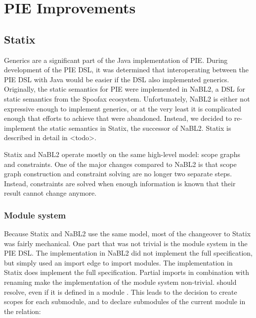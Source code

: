 \chapter{\label{chap:pie_improvements}PIE Improvements}


\section{\label{sec:solution__statix}Statix}
Generics are a significant part of the Java implementation of \ac{PIE}.
During development of the \ac{PIE} \ac{DSL}, it was determined that interoperating between the \ac{PIE} \ac{DSL} with Java would be easier if the \ac{DSL} also implemented generics.
Originally, the static semantics for \ac{PIE} were implemented in NaBL2, a \ac{DSL} for static semantics from the Spoofax ecosystem.
Unfortunately, \ac{NaBL2} is either not expressive enough to implement generics, or at the very least it is complicated enough that efforts to achieve that were abandoned. 
Instead, we decided to re-implement  the static semantics in Statix, the successor of \ac{NaBL2}.
Statix is described in detail in <todo>.

Statix and \ac{NaBL2} operate mostly on the same high-level model: scope graphs and constraints.
One of the major changes compared to \ac{NaBL2} is that scope graph construction and constraint solving are no longer two separate steps.
Instead, constraints are solved when enough information is known that their result cannot change anymore.

\subsection{\label{subsec:solution__statix__module_system}Module system}
Because Statix and \ac{NaBL2} use the same model, most of the changeover to Statix was fairly mechanical.
One part that was not trivial is the module system in the \ac{PIE} \ac{DSL}.
The implementation in \ac{NaBL2} did not implement the full specification, but simply used an import edge to import modules. 
The implementation in Statix does implement the full specification.
Partial imports  in combination with renaming make the implementation of the module system non-trivial.
 should resolve, even if it is defined in a module .
This leads to the decision to create scopes for each submodule, and to declare submodules of the current module in the  relation:

